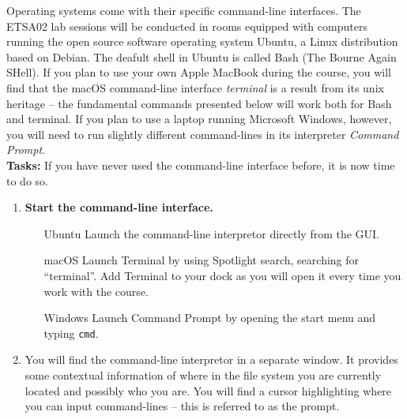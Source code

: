 \documentclass{scrreprt}
\begin{document}
Operating systems come with their specific command-line interfaces. The ETSA02 lab sessions will be conducted in rooms equipped with computers running the open source software operating system Ubuntu, a Linux distribution based on Debian. The deafult shell in Ubuntu is called Bash (The Bourne Again SHell). If you plan to use your own Apple MacBook during the course, you will find that the macOS command-line interface \textit{terminal} is a result from its unix heritage -- the fundamental commands presented below will work both for Bash and terminal. If you plan to use a laptop running Microsoft Windows, however, you will need to run slightly different command-lines in its interpreter \textit{Command Prompt}.\\

\textbf{Tasks:} If you have never used the command-line interface before, it is now time to do so. 

\begin{enumerate}
\item \textbf{Start the command-line interface.} 
\begin{itemize}
\item[Ubuntu] Launch the command-line interpretor directly from the GUI.
\item[macOS] Launch Terminal by using Spotlight search, searching for ``terminal''. Add Terminal to your dock as you will open it every time you work with the course.
\item[Windows] Launch Command Prompt by opening the start menu and typing \texttt{cmd}.
\end{itemize}
\item You will find the command-line interpretor in a separate window. It  provides some contextual information of where in the file system you are currently located and possibly who you are. You will find a cursor highlighting where you can input command-lines -- this is referred to as the prompt.
\end{enumerate}
\end{document}
